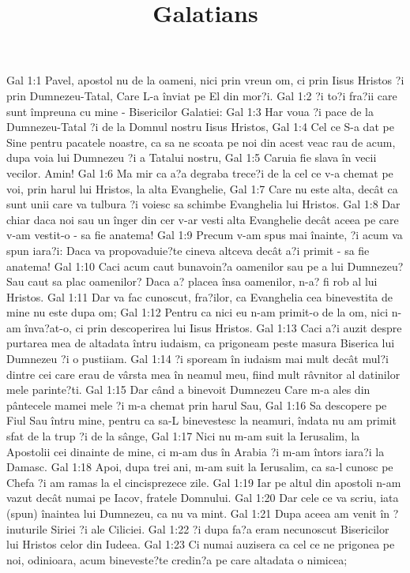 

\title{Galatians}

Gal 1:1  Pavel, apostol nu de la oameni, nici prin vreun om, ci prin Iisus Hristos ?i prin Dumnezeu-Tatal, Care L-a înviat pe El din mor?i.
Gal 1:2  ?i to?i fra?ii care sunt împreuna cu mine - Bisericilor Galatiei:
Gal 1:3  Har voua ?i pace de la Dumnezeu-Tatal ?i de la Domnul nostru Iisus Hristos,
Gal 1:4  Cel ce S-a dat pe Sine pentru pacatele noastre, ca sa ne scoata pe noi din acest veac rau de acum, dupa voia lui Dumnezeu ?i a Tatalui nostru,
Gal 1:5  Caruia fie slava în vecii vecilor. Amin!
Gal 1:6  Ma mir ca a?a degraba trece?i de la cel ce v-a chemat pe voi, prin harul lui Hristos, la alta Evanghelie,
Gal 1:7  Care nu este alta, decât ca sunt unii care va tulbura ?i voiesc sa schimbe Evanghelia lui Hristos.
Gal 1:8  Dar chiar daca noi sau un înger din cer v-ar vesti alta Evanghelie decât aceea pe care v-am vestit-o - sa fie anatema!
Gal 1:9  Precum v-am spus mai înainte, ?i acum va spun iara?i: Daca va propovaduie?te cineva altceva decât a?i primit - sa fie anatema!
Gal 1:10  Caci acum caut bunavoin?a oamenilor sau pe a lui Dumnezeu? Sau caut sa plac oamenilor? Daca a? placea însa oamenilor, n-a? fi rob al lui Hristos.
Gal 1:11  Dar va fac cunoscut, fra?ilor, ca Evanghelia cea binevestita de mine nu este dupa om;
Gal 1:12  Pentru ca nici eu n-am primit-o de la om, nici n-am înva?at-o, ci prin descoperirea lui Iisus Hristos.
Gal 1:13  Caci a?i auzit despre purtarea mea de altadata întru iudaism, ca prigoneam peste masura Biserica lui Dumnezeu ?i o pustiiam.
Gal 1:14  ?i spoream în iudaism mai mult decât mul?i dintre cei care erau de vârsta mea în neamul meu, fiind mult râvnitor al datinilor mele parinte?ti.
Gal 1:15  Dar când a binevoit Dumnezeu Care m-a ales din pântecele mamei mele ?i m-a chemat prin harul Sau,
Gal 1:16  Sa descopere pe Fiul Sau întru mine, pentru ca sa-L binevestesc la neamuri, îndata nu am primit sfat de la trup ?i de la sânge,
Gal 1:17  Nici nu m-am suit la Ierusalim, la Apostolii cei dinainte de mine, ci m-am dus în Arabia ?i m-am întors iara?i la Damasc.
Gal 1:18  Apoi, dupa trei ani, m-am suit la Ierusalim, ca sa-l cunosc pe Chefa ?i am ramas la el cincisprezece zile.
Gal 1:19  Iar pe altul din apostoli n-am vazut decât numai pe Iacov, fratele Domnului.
Gal 1:20  Dar cele ce va scriu, iata (spun) înaintea lui Dumnezeu, ca nu va mint.
Gal 1:21  Dupa aceea am venit în ?inuturile Siriei ?i ale Ciliciei.
Gal 1:22  ?i dupa fa?a eram necunoscut Bisericilor lui Hristos celor din Iudeea.
Gal 1:23  Ci numai auzisera ca cel ce ne prigonea pe noi, odinioara, acum bineveste?te credin?a pe care altadata o nimicea;
